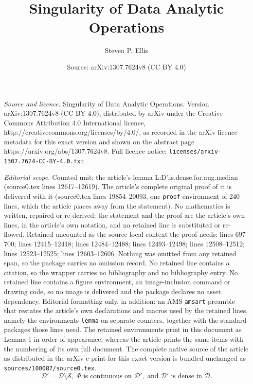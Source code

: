 \documentclass[10pt,a4paper]{amsart}
\title{Singularity of Data Analytic Operations}
\author{Steven P. Ellis}
\date{Source: arXiv:1307.7624v8 (CC BY 4.0)}
\newcommand{\D}{\mathcal{D}}
\newcommand{\Ss}{\mathcal{S}}
\begin{document}
\maketitle

\noindent\emph{Source and licence.} Singularity of Data Analytic Operations. Version arXiv:1307.7624v8 (CC BY 4.0), distributed by arXiv under the Creative Commons Attribution 4.0 International licence, http://creativecommons.org/licenses/by/4.0/, as recorded in the arXiv licence metadata for this exact version and shown on the abstract page https://arxiv.org/abs/1307.7624v8. Full licence notice: \texttt{licenses/arxiv-1307.7624-CC-BY-4.0.txt}.\par\smallskip

\noindent\textit{Editorial scope.} Counted unit: the article's lemma L:D'.is.dense.for.aug.median (source0.tex lines 12617--12619). The article's complete original proof of it is delivered with it (source0.tex lines 19854--20093, one \texttt{proof} environment of 240 lines, which the article places away from the statement). No mathematics is written, repaired or re-derived: the statement and the proof are the article's own lines, in the article's own notation, and no retained line is substituted or re-flowed.  Retained uncounted as the source-local context the proof needs: lines 697--700; lines 12415--12418; lines 12484--12488; lines 12493--12498; lines 12508--12512; lines 12523--12525; lines 12603--12606.  Nothing was omitted from any retained span, so the package carries no omission record.  No retained line contains a citation, so the wrapper carries no bibliography and no bibliography entry.  No retained line contains a figure environment, an image-inclusion command or drawing code, so no image is delivered and the package declares no asset dependency.  Editorial formatting only, in addition: an AMS \texttt{amsart} preamble that restates the article's own declarations and macros used by the retained lines, namely the environments \texttt{lemma} on separate counters, together with the standard packages those lines need.  The retained environments print in this document as Lemma 1 in order of appearance, whereas the article prints the same items with the numbering of its own full document.  The complete native source of the article as distributed in the arXiv e-print for this exact version is bundled unchanged as \texttt{sources/100087/source0.tex}.
   \begin{equation}  \label{E:D'.=.D.less.S}
      \D' = \D \setminus \Ss, \; \Phi \text{ is continuous on } \D', 
        \text{ and $\D'$ is dense in $\D$}.
   \end{equation} 
\end{document}
